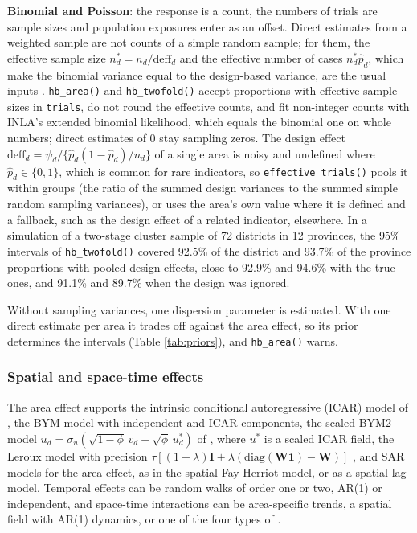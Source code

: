 \begin{itemize}
  \textbf{Binomial and Poisson}: the response is a count, the numbers of trials are sample sizes and population exposures enter as an offset. Direct estimates from a weighted sample are not counts of a simple random sample; for them, the effective sample size \(n^*_d = n_d/\mathrm{deff}_d\) and the effective number of cases \(n^*_d\hat{p}_d\), which make the binomial variance equal to the design-based variance, are the usual inputs \citep{chen2014use, franco2015borrowing}. \texttt{hb\_area()} and \texttt{hb\_twofold()} accept proportions with effective sample sizes in \texttt{trials}, do not round the effective counts, and fit non-integer counts with INLA's extended binomial likelihood, which equals the binomial one on whole numbers; direct estimates of 0 stay sampling zeros. The design effect \(\mathrm{deff}_d = \psi_d/\{\hat{p}_d(1 - \hat{p}_d)/n_d\}\) of a single area is noisy and undefined where \(\hat{p}_d \in \{0, 1\}\), which is common for rare indicators, so \texttt{effective\_trials()} pools it within groups (the ratio of the summed design variances to the summed simple random sampling variances), or uses the area's own value where it is defined and a fallback, such as the design effect of a related indicator, elsewhere. In a simulation of a two-stage cluster sample of 72 districts in 12 provinces, the 95\% intervals of \texttt{hb\_twofold()} covered 92.5\% of the district and 93.7\% of the province proportions with pooled design effects, close to 92.9\% and 94.6\% with the true ones, and 91.1\% and 89.7\% when the design was ignored.
\end{itemize}

Without sampling variances, one dispersion parameter is estimated. With one direct estimate per area it trades off against the area effect, so its prior determines the intervals (Table \ref{tab:priors}), and \texttt{hb\_area()} warns.

\subsubsection{Spatial and space-time effects}\label{spatial-and-space-time-effects}

The area effect supports the intrinsic conditional autoregressive (ICAR) model of \citet{besag1991bayesian}, the BYM model with independent and ICAR components, the scaled BYM2 model \(u_d = \sigma_u(\sqrt{1 - \phi}\,v_d + \sqrt{\phi}\,u^*_d)\) of \citet{riebler2016intuitive}, where \(u^*\) is a scaled ICAR field, the Leroux model with precision \(\tau[(1 - \lambda)\boldsymbol{I} + \lambda(\mathrm{diag}(\boldsymbol{W}\boldsymbol{1}) - \boldsymbol{W})]\) \citep{leroux2000estimation}, and SAR models for the area effect, as in the spatial Fay-Herriot model, or as a spatial lag model. Temporal effects can be random walks of order one or two, AR(1) or independent, and space-time interactions can be area-specific trends, a spatial field with AR(1) dynamics, or one of the four types of \citet{knorrheld2000bayesian}.

